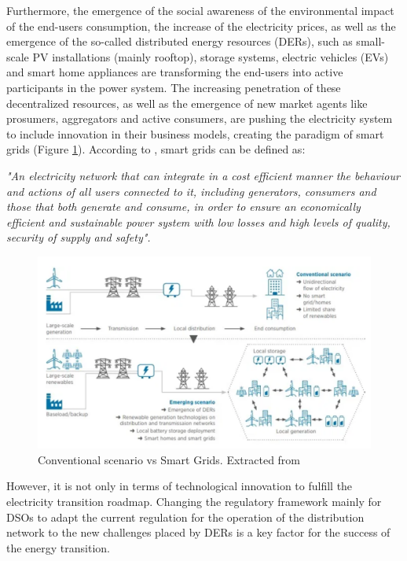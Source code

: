 Furthermore, the emergence of the social awareness of the environmental impact of the end-users consumption, the increase of the electricity prices, as well as the emergence of the so-called distributed energy resources (DERs), such as small-scale PV installations (mainly rooftop), storage systems, electric vehicles (EVs) and smart home appliances are transforming the end-users into active participants in the power system. The increasing penetration of these decentralized resources, as well as the emergence of new market agents like prosumers, aggregators and active consumers, are pushing the electricity system to include innovation in their business models, creating the paradigm of smart grids (Figure \ref{fig:IRENA-DSO}). According to \cite{EuropeanParliamentSG}, smart grids can be defined as:
\vspace*{3mm}
\begin{tcolorbox}
\textit{"An electricity network that can integrate in a cost efficient manner the behaviour and actions of all users connected to it, including generators, consumers and those that both generate and consume, in order to ensure an economically efficient and sustainable power system with low losses and high levels of quality, security of supply and safety".} 
\end{tcolorbox}
\vspace*{5mm}

\begin{figure}[htbp]
	\centering 
	\includegraphics[width=0.9\columnwidth ]{ChapterIntro/Figures/Irena-DSO-1.png}
		\caption{Conventional scenario vs Smart Grids. Extracted from \cite{IRENA2018}}  
		\label{fig:IRENA-DSO}
\end{figure}

However, it is not only in terms of technological innovation to fulfill the electricity transition roadmap. Changing the regulatory framework mainly for DSOs to adapt the current regulation for the operation of the distribution network to the new challenges placed by DERs is a key factor for the success of the energy transition.


